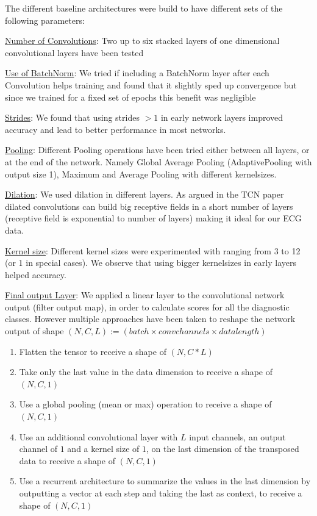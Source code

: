 The different baseline architectures were build to have different sets of the following parameters:
\begin{description}
	\item \underline{Number of Convolutions}: Two up to six stacked layers of one dimensional convolutional layers have been tested
	\item \underline{Use of BatchNorm}: We tried if including a BatchNorm\autocite{ioffe2015batch} layer after each Convolution helps training and found that it slightly sped up convergence but since we trained for a fixed set of epochs this benefit was negligible
	\item \underline{Strides}: We found that using strides $>1$ in early network layers improved accuracy and lead to better performance in most networks.
	\item \underline{Pooling}: Different Pooling operations have been tried either between all layers, or at the end of the network. Namely Global Average Pooling (AdaptivePooling with output size 1), Maximum and Average Pooling with different kernelsizes. 
	\item \underline{Dilation}: We used dilation in different layers. As argued in the TCN paper \autocite{yu2016multiscale} dilated convolutions can build big receptive fields in a short number of layers (receptive field is exponential to number of layers) making it ideal for our ECG data.
	\item \underline{Kernel size}: Different kernel sizes were experimented with ranging from 3 to 12 (or 1 in special cases). We observe that using bigger kernelsizes in early layers helped accuracy.
	\item \underline{Final output Layer}: We applied a linear layer to the convolutional network output (filter output map), in order to calculate scores for all the diagnostic classes. However multiple approaches have been taken to reshape the network output of shape $(N, C, L) := (\mathit{batch} \times \mathit{convchannels} \times \mathit{datalength})$
	\begin{enumerate} \label{desc:enum}
		\item \label{desc:en1} Flatten the tensor to receive a shape of $(N, C*L)$
		\item \label{desc:en2} Take only the last value in the data dimension to receive a shape of $(N, C, 1)$
		\item \label{desc:en3} Use a global pooling (mean or max) operation to receive a shape of $(N, C, 1)$
		\item \label{desc:en4} Use an additional convolutional layer  with $L$ input channels, an output channel of $1$ and a kernel size of $1$, on the last dimension of the transposed data to receive a shape of $(N, C, 1)$
		\item \label{desc:en5} Use a recurrent architecture to summarize the values in the last dimension by outputting a vector at each step and taking the last as context, to receive a shape of $(N, C, 1)$		
	\end{enumerate}
\end{description}
